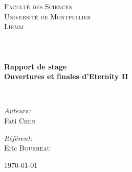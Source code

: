 
\begin{titlepage}
	\begin{center}
	
	
	\textsc{\LARGE Faculté des Sciences\\
		Université de Montpellier\\
		Lirmm\\} \ \\[1.5cm]
	
	\textsc{\Large }\\[0.5cm]
	
	\HRule \\[0.4cm]
	
	{\huge \bfseries Rapport de stage\\
	Ouvertures et finales d'Eternity II\\[0.4cm] }
	
	\HRule \\[1.5cm]
	
	\begin{minipage}{0.4\textwidth}
		\begin{flushleft} \large
			\emph{Auteurs:}\\
				Fati \textsc{Chen}\\
		\end{flushleft}
	\end{minipage}
	\begin{minipage}{0.4\textwidth}
		\begin{flushright} \large
			\emph{Référent:} \\
				Eric \textsc{Bourreau}
		\end{flushright}
	\end{minipage}
	
	\vfill
	\thispagestyle{empty}

	{\large \today}
	\end{center}
\end{titlepage}

